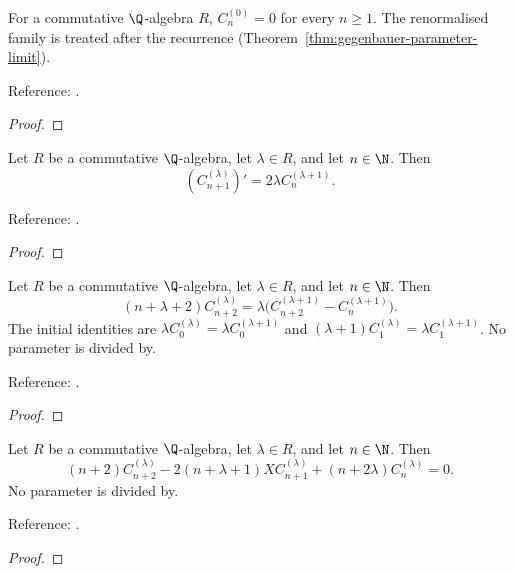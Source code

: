 \begin{theorem}
\label{thm:gegenbauer-zero-parameter}
\leanok
For a commutative $\Q$-algebra $R$, $C_n^{(0)}=0$ for every $n\ge1$.
The renormalised family is
treated after the recurrence (Theorem~\ref{thm:gegenbauer-parameter-limit}).

Reference: \cite[18.5.10]{dlmf}.
\end{theorem}
\begin{proof}
\leanok
\end{proof}

\begin{theorem}
\label{thm:gegenbauer-derivative}
\leanok
Let $R$ be a commutative $\Q$-algebra, let $\lambda\in R$, and let $n\in\N$. Then
\[(C_{n+1}^{(\lambda)})'=2\lambda C_n^{(\lambda+1)}.\]

Reference: \cite[18.9.19]{dlmf}.
\end{theorem}
\begin{proof}
\leanok
\end{proof}

\begin{theorem}
\label{thm:gegenbauer-conversion}
\leanok
Let $R$ be a commutative $\Q$-algebra, let $\lambda\in R$, and let $n\in\N$. Then
\[(n+\lambda+2)C_{n+2}^{(\lambda)}
=\lambda\bigl(C_{n+2}^{(\lambda+1)}-C_n^{(\lambda+1)}\bigr).\]
The initial identities are $\lambda C_0^{(\lambda)}=\lambda C_0^{(\lambda+1)}$
and $(\lambda+1)C_1^{(\lambda)}=\lambda C_1^{(\lambda+1)}$.
No parameter is divided by.

Reference: \cite[18.9.7]{dlmf}.
\end{theorem}
\begin{proof}
\leanok
\end{proof}

\begin{theorem}
\label{thm:gegenbauer-recurrence}
\leanok
Let $R$ be a commutative $\Q$-algebra, let $\lambda\in R$, and let $n\in\N$. Then
\[(n+2)C_{n+2}^{(\lambda)}-2(n+\lambda+1)X C_{n+1}^{(\lambda)}
 +(n+2\lambda)C_n^{(\lambda)}=0.\]
No parameter is divided by.

Reference: \cite[Table 18.9.1]{dlmf}.
\end{theorem}
\begin{proof}
\leanok
\end{proof}

